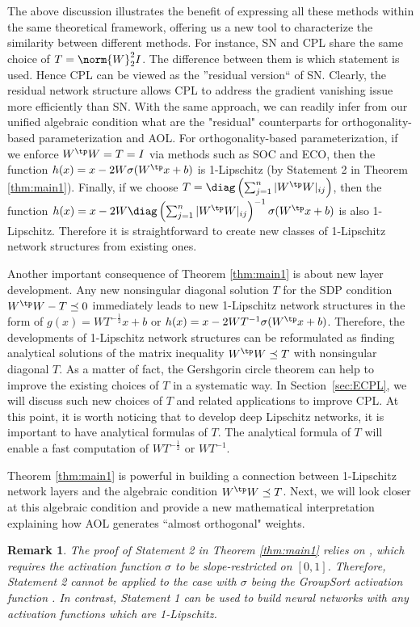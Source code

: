 \documentclass{article} \usepackage{iclr2023_conference,times}
\newtheorem{remark}{Remark}
\newcommand{\0}{\mathbf{0} }
\begin{document}
The above discussion illustrates the benefit of expressing all these methods within the same theoretical framework, offering us a new tool to characterize the similarity  between different methods.
For instance, SN and CPL share the same choice of $T=\norm{W}_2^2 I$. The difference between them is which statement is used. Hence CPL can be viewed as the ''residual version`` of SN. Clearly, the residual network structure allows CPL to address the gradient vanishing issue more efficiently than SN.
With the same approach, we can readily infer from our unified algebraic condition what are the  "residual" counterparts for orthogonality-based parameterization and AOL. 
For orthogonality-based parameterization, if we enforce $W^\tp W=T=I$ via methods such as SOC and ECO, then the function $h(x)=x-2W\sigma(W^\tp x+b)$ is 1-Lipschitz (by Statement 2 in Theorem \ref{thm:main1}). Finally,  if we choose $T=\diag\left(\sum_{j=1}^n |W^\tp W|_{ij}\right)$, then the function $h(x)=x-2W\diag\left(\sum_{j=1}^n |W^\tp W|_{ij}\right)^{-1}\sigma(W^\tp x+b)$ is also 1-Lipschitz. Therefore it is straightforward to create  new classes of 1-Lipschitz network structures from existing ones. 

Another important consequence of Theorem \ref{thm:main1} is about new layer development. Any  new nonsingular diagonal solution $T$ for the SDP condition $W^\tp W-T\preceq 0$  immediately leads to new 1-Lipschitz network structures in the form of $g(x)=WT^{-\frac{1}{2}}x+b$ or $h(x)=x-2WT^{-1}\sigma(W^\tp x+b)$. Therefore, the developments of 1-Lipschitz network structures can be reformulated as finding analytical solutions of the matrix inequality $W^\tp W\preceq T$ with nonsingular diagonal $T$. 
As a matter of fact,  the Gershgorin circle theorem can help to improve the existing choices of $T$ in a systematic way. In Section~\ref{sec:ECPL}, we will discuss such new choices of $T$ and related applications to improve CPL. At this point, it is worth noticing that to develop deep Lipschitz networks, it is important to have analytical formulas of $T$. The analytical formula of $T$ will enable a fast computation of  $WT^{-\frac{1}{2}}$ or $WT^{-1}$.  

Theorem \ref{thm:main1} is powerful in building a connection between 1-Lipschitz network layers and the algebraic condition $W^\tp W\preceq T$. Next, we will look closer at this algebraic condition and provide a new mathematical interpretation explaining how AOL generates ``almost orthogonal" weights.  


\begin{remark}
The proof of Statement 2 in Theorem \ref{thm:main1} relies on \cite[Lemma 1]{fazlyab2019efficient}, which requires the activation function $\sigma$ to be slope-restricted on $[0,1]$. Therefore, Statement 2 cannot be applied to the case with $\sigma$ being the GroupSort activation function \citep{anil2019sorting}. In contrast, Statement 1 can be used to build neural networks with any activation functions which are 1-Lipschitz. 
\end{remark}
\end{document}
